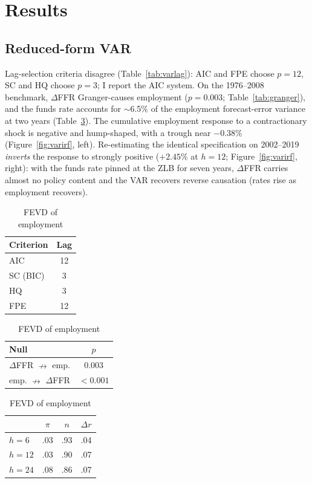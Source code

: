 \documentclass[11pt]{article}
\begin{document}
\section{Results}

\subsection{Reduced-form VAR}
Lag-selection criteria disagree (Table~\ref{tab:varlag}): AIC and FPE choose $p=12$, SC and HQ
choose $p=3$; I report the AIC system. On the 1976--2008 benchmark, $\Delta$FFR Granger-causes
employment ($p=0.003$; Table~\ref{tab:granger}), and the funds rate accounts for $\sim$6.5\% of
the employment forecast-error variance at two years (Table~\ref{tab:fevd}). The cumulative
employment response to a contractionary shock is negative and hump-shaped, with a trough near
$-0.38\%$ (Figure~\ref{fig:varirf}, left). Re-estimating the identical specification on
2002--2019 \emph{inverts} the response to strongly positive ($+2.45\%$ at $h=12$;
Figure~\ref{fig:varirf}, right): with the funds rate pinned at the ZLB for seven years,
$\Delta$FFR carries almost no policy content and the VAR recovers reverse causation (rates rise
as employment recovers).

\begin{table}[H]\centering
\begin{minipage}[t]{0.32\textwidth}\centering
\caption{VAR lag selection}\label{tab:varlag}\small
\begin{tabular}{lc}\toprule Criterion & Lag \\ \midrule AIC & 12 \\ SC (BIC) & 3 \\ HQ & 3 \\ FPE & 12 \\ \bottomrule\end{tabular}
\end{minipage}\hfill
\begin{minipage}[t]{0.32\textwidth}\centering
\caption{Granger causality}\label{tab:granger}\small
\begin{tabular}{lc}\toprule Null & $p$ \\ \midrule $\Delta$FFR $\nrightarrow$ emp. & 0.003 \\ emp. $\nrightarrow$ $\Delta$FFR & $<0.001$ \\ \bottomrule\end{tabular}
\end{minipage}\hfill
\begin{minipage}[t]{0.32\textwidth}\centering
\caption{FEVD of employment}\label{tab:fevd}\small
\begin{tabular}{lccc}\toprule & $\pi$ & $n$ & $\Delta r$ \\ \midrule $h{=}6$ & .03 & .93 & .04 \\ $h{=}12$ & .03 & .90 & .07 \\ $h{=}24$ & .08 & .86 & .07 \\ \bottomrule\end{tabular}
\end{minipage}
\end{table}
\end{document}
